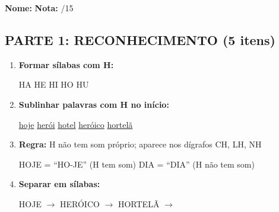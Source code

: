 \begin{exercicio}

\noindent\textbf{Nome:} \underline{\hspace{4cm}} \quad \textbf{Nota:} \underline{\hspace{1cm}}/15

\subsection*{PARTE 1: RECONHECIMENTO (5 itens)}

\begin{enumerate}
  \item \textbf{Formar sílabas com H:}
  \begin{center}
  HA \quad HE \quad HI \quad HO \quad HU
  \end{center}

  \item \textbf{Sublinhar palavras com H no início:}
  \begin{center}
  \uline{hoje} \quad \uline{herói} \quad \uline{hotel} \quad \uline{heróico} \quad \uline{hortelã}
  \end{center}

  \item \textbf{Regra:} H não tem som próprio; aparece nos dígrafos CH, LH, NH
  \begin{center}
  HOJE = ``HO-JE'' (H tem som) \quad DIA = ``DIA'' (H não tem som)
  \end{center}

  \item \textbf{Separar em sílabas:}
  \begin{center}
  HOJE $\rightarrow$ \underline{\hspace{1.5cm}} \underline{\hspace{1.5cm}} \quad HERÓICO $\rightarrow$ \underline{\hspace{1.5cm}} \underline{\hspace{1.5cm}} \underline{\hspace{1.5cm}} \underline{\hspace{1.5cm}} \quad HORTELÃ $\rightarrow$ \underline{\hspace{1.5cm}} \underline{\hspace{1.5cm}} \underline{\hspace{1.5cm}}
  \end{center}


\end{enumerate}
\end{exercicio}
